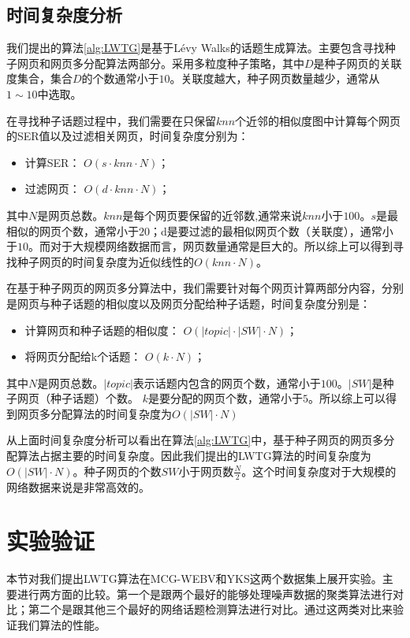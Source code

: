 \subsection{时间复杂度分析}

我们提出的算法\ref{alg:LWTG}是基于L\'evy Walks的话题生成算法。主要包含寻找种子网页和网页多分配算法两部分。采用多粒度种子策略，其中$D$是种子网页的关联度集合，集合$D$的个数通常小于$10$。关联度越大，种子网页数量越少，通常从$1\sim10$中选取。

在寻找种子话题过程中，我们需要在只保留$knn$个近邻的相似度图中计算每个网页的SER值以及过滤相关网页，时间复杂度分别为：
\begin{itemize}
  \item 计算SER： $O(s\cdot knn\cdot N)$；
  \item 过滤网页： $O(d\cdot knn\cdot N)$；
\end{itemize}
其中$N$是网页总数。$knn$是每个网页要保留的近邻数,通常来说$knn$小于$100$。$s$是最相似的网页个数，通常小于$20$；d是要过滤的最相似网页个数（关联度），通常小于$10$。而对于大规模网络数据而言，网页数量通常是巨大的。所以综上可以得到寻找种子网页的时间复杂度为近似线性的$O(knn\cdot N)$。

在基于种子网页的网页多分算法中，我们需要针对每个网页计算两部分内容，分别是网页与种子话题的相似度以及网页分配给种子话题，时间复杂度分别是：
\begin{itemize}
  \item 计算网页和种子话题的相似度： $O(|topic|\cdot |SW|\cdot N)$；
  \item 将网页分配给k个话题： $O(k\cdot N)$；
\end{itemize}
其中$N$是网页总数。$|topic|$表示话题内包含的网页个数，通常小于$100$。$|SW|$是种子网页（种子话题）个数。
$k$是要分配的网页个数，通常小于$5$。所以综上可以得到网页多分配算法的时间复杂度为$O(|SW|\cdot N)$

从上面时间复杂度分析可以看出在算法\ref{alg:LWTG}中，基于种子网页的网页多分配算法占据主要的时间复杂度。因此我们提出的LWTG算法的时间复杂度为$O(|SW|\cdot N)$。种子网页的个数$SW$小于网页数$\frac{N}{2}$。这个时间复杂度对于大规模的网络数据来说是非常高效的。



\section{实验验证}
本节对我们提出LWTG算法在MCG-WEBV和YKS这两个数据集上展开实验。主要进行两方面的比较。第一个是跟两个最好的能够处理噪声数据的聚类算法进行对比；第二个是跟其他三个最好的网络话题检测算法进行对比。通过这两类对比来验证我们算法的性能。

